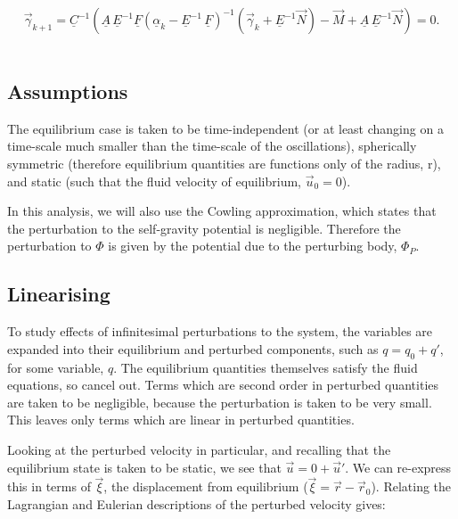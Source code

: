 \documentclass[11pt]{amsart}
\begin{document}
\begin{equation} \label{eq:IVgamma}
\vec{\gamma}_{k+1}  =   \underline{C}^{-1}  \left(  \underline{A} \, \underline{E}^{-1} \underline{F} \left(   \underline{\alpha}_{k}  -  \underline{E}^{-1} \, \underline{F}  \right)^{-1}  \left(\vec{\gamma}_{k}  +  \underline{E}^{-1} \vec{N} \right)   -  \vec{M}  +  \underline{A} \, \underline{E}^{-1} \vec{N}  \right)  =  0.
\end{equation} 
\\













\subsection{Assumptions}

The equilibrium case is taken to be time-independent (or at least changing on a time-scale much 
smaller than the time-scale of the oscillations), spherically symmetric (therefore equilibrium 
quantities are functions only of the radius, r), and static (such that the fluid velocity of 
equilibrium, $\vec{u}_{0} = 0$).

In this analysis, we will also use the Cowling approximation, which states that the perturbation
to the self-gravity potential is negligible.  Therefore the perturbation to $\Phi$ is given by 
the potential due to the perturbing body, $\Phi_{P}$.



\subsection{Linearising}

To study effects of infinitesimal perturbations to the system, the variables are expanded into
their equilibrium and perturbed components, such as $q = q_{0} + q'$, for some variable, $q$.
The equilibrium quantities themselves satisfy the fluid equations, so cancel out.  Terms which are
second order in perturbed quantities are taken to be negligible, because the perturbation is
taken to be very small. This leaves only terms which are linear in perturbed quantities.

Looking at the perturbed velocity in particular, and recalling that the equilibrium state is taken
to be static, we see that $\vec{u} = 0 + \vec{u}'$.  We can re-express this in terms of $\vec{\xi}$,
 the displacement from equilibrium ($\vec{\xi} = \vec{r} - \vec{r}_{0}$).  Relating the Lagrangian and 
Eulerian descriptions of the perturbed velocity gives:
\end{document}
